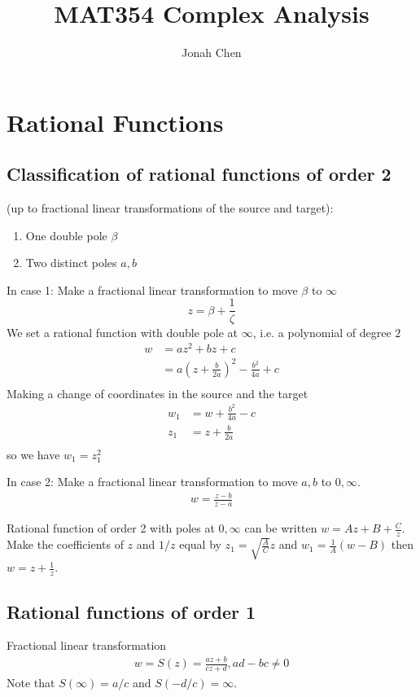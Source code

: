 \documentclass[a4paper,12pt]{article}
\title{MAT354 Complex Analysis}
\author{Jonah Chen}
\date{}
\begin{document}
\maketitle
\sffamily

\section{Rational Functions}
\subsection{Classification of rational functions of order 2}
(up to fractional linear transformations of the source and target):
\begin{enumerate}
    \item One double pole $\beta$
    \item Two distinct poles $a,b$
\end{enumerate}

In case 1: Make a fractional linear transformation to move $\beta$ to $\infty$
\begin{equation}
    z=\beta+\frac{1}{\zeta}
\end{equation}
We set a rational function with double pole at $\infty$, i.e. a polynomial of degree $2$
\begin{align}
    w&=az^2+bz+c\\
    &=a\left(z+\frac{b}{2a}\right)^2-\frac{b^2}{4a}+c\\
\end{align}
Making a change of coordinates in the source and the target
\begin{align}
    w_1&=w+\frac{b^2}{4a}-c\\
    z_1&=z+\frac{b}{2a}\\
\end{align}
so we have $w_1=z_1^2$

In case 2: Make a fractional linear transformation to move $a,b$ to $0,\infty$.
\begin{align}
    w=\frac{z-b}{z-a}
\end{align}

Rational function of order 2 with poles at $0,\infty$ can be written $w=Az+B+\frac{C}{z}$. Make the coefficients of $z$ and $1/z$ equal by $z_1=\sqrt{\frac{A}{C}}z$ and $w_1=\frac{1}{A}(w-B)$ then $w=z+\frac{1}{z}$.

\subsection{Rational functions of order 1}
Fractional linear transformation \begin{align}
    w=S(z)=\frac{az+b}{cz+d}, ad-bc\neq0
\end{align}
Note that $S(\infty)=a/c$ and $S(-d/c)=\infty$.
\end{document}
